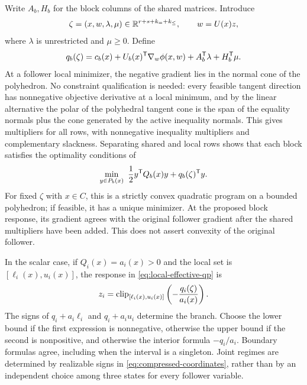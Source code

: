 Write $A_b,H_b$ for the block columns of the shared matrices. Introduce
\begin{equation}\label{eq:compressed-coordinates}
 \zeta=(x,w,\lambda,\mu)\in
 \mathbb R^{r+s+k_=+k_{\le}},\qquad w=U(x)z,
\end{equation}
where $\lambda$ is unrestricted and $\mu\ge0$. Define
\begin{equation}\label{eq:effective-linear-cost}
 q_b(\zeta)=c_b(x)+U_b(x)^{\mathsf T}\nabla_w\phi(x,w)
                         +A_b^{\mathsf T}\lambda+H_b^{\mathsf T}\mu.
\end{equation}
At a follower local minimizer, the negative gradient lies in the normal
cone of the polyhedron. No constraint qualification is needed: every
feasible tangent direction has nonnegative objective derivative at a local
minimum, and by the linear alternative the polar of the polyhedral tangent
cone is the span of the equality normals plus the cone generated by the
active inequality normals. This gives multipliers
for all rows, with nonnegative inequality multipliers and complementary
slackness. Separating shared and local rows shows that each block satisfies
the optimality conditions of
\begin{equation}\label{eq:local-effective-qp}
 \min_{y\in P_b(x)}\ \frac12 y^{\mathsf T} Q_b(x)y+q_b(\zeta)^{\mathsf T} y.
\end{equation}
For fixed $\zeta$ with $x\in C$, this is a strictly convex quadratic
program on a bounded polyhedron; if feasible, it has a unique minimizer.
At the proposed block response, its gradient agrees with the original
follower gradient after the shared multipliers have been added. This does
not assert convexity of the original follower.

In the scalar case, if $Q_i(x)=a_i(x)>0$
and the local set is $[\ell_i(x),u_i(x)]$, the response in
\eqref{eq:local-effective-qp} is
\begin{equation}\label{eq:scalar-clipping}
 z_i=\operatorname{clip}_{[\ell_i(x),u_i(x)]}\left(-\frac{q_i(\zeta)}{a_i(x)}\right).
\end{equation}
The signs of $q_i+a_i\ell_i$ and $q_i+a_i u_i$ determine the branch.
Choose the lower bound if the first expression is nonnegative, otherwise
the upper bound if the second is nonpositive, and otherwise the interior
formula $-q_i/a_i$. Boundary formulas agree, including when the interval
is a singleton. Joint regimes are determined by realizable signs in
\eqref{eq:compressed-coordinates}, rather than by an independent choice
among three states for every follower variable.

